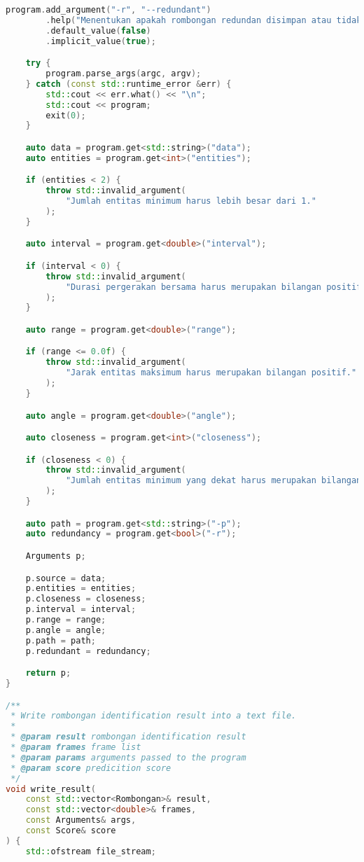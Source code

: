 \begin{lstlisting}[language=C++, caption=Implementasi 
modul \texttt{io.cpp},label={lamp:module-io}]
    program.add_argument("-r", "--redundant")
        .help("Menentukan apakah rombongan redundan disimpan atau tidak")
        .default_value(false)
        .implicit_value(true);

    try {
        program.parse_args(argc, argv);
    } catch (const std::runtime_error &err) {
        std::cout << err.what() << "\n";
        std::cout << program;
        exit(0);
    }

    auto data = program.get<std::string>("data");
    auto entities = program.get<int>("entities");

    if (entities < 2) {
        throw std::invalid_argument(
            "Jumlah entitas minimum harus lebih besar dari 1."
        );
    }

    auto interval = program.get<double>("interval");

    if (interval < 0) {
        throw std::invalid_argument(
            "Durasi pergerakan bersama harus merupakan bilangan positif 1."
        );
    }

    auto range = program.get<double>("range");

    if (range <= 0.0f) {
        throw std::invalid_argument(
            "Jarak entitas maksimum harus merupakan bilangan positif."
        );
    }

    auto angle = program.get<double>("angle");

    auto closeness = program.get<int>("closeness");

    if (closeness < 0) {
        throw std::invalid_argument(
            "Jumlah entitas minimum yang dekat harus merupakan bilangan tak negatif"
        );
    }

    auto path = program.get<std::string>("-p");
    auto redundancy = program.get<bool>("-r");

    Arguments p;

    p.source = data;
    p.entities = entities;
    p.closeness = closeness;
    p.interval = interval;
    p.range = range;
    p.angle = angle;
    p.path = path;
    p.redundant = redundancy;

    return p;
}

/**
 * Write rombongan identification result into a text file.
 * 
 * @param result rombongan identification result
 * @param frames frame list
 * @param params arguments passed to the program
 * @param score predicition score
 */
void write_result(
    const std::vector<Rombongan>& result,
    const std::vector<double>& frames,
    const Arguments& args,
    const Score& score
) {
    std::ofstream file_stream;


\end{lstlisting}
